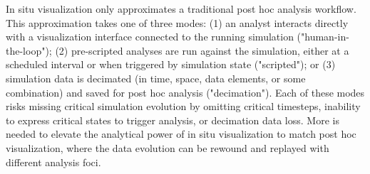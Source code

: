 \documentclass{vgtc}
\begin{document}
    
    


In situ visualization only approximates a traditional post hoc analysis workflow. This approximation takes one of three modes: (1) an analyst interacts directly with a visualization interface connected to the running simulation ("human-in-the-loop"); (2) pre-scripted analyses are run against the simulation, either at a scheduled interval or when triggered by simulation state ("scripted"); or (3) simulation data is decimated (in time, space, data elements, or some combination) and saved for post hoc analysis ("decimation"). Each of these modes risks missing critical simulation evolution by omitting critical timesteps, inability to express critical states to trigger analysis, or decimation data loss. More is needed to elevate the analytical power of in situ visualization to match post hoc visualization, where the data evolution can be rewound and replayed with different analysis foci.
\end{document}
